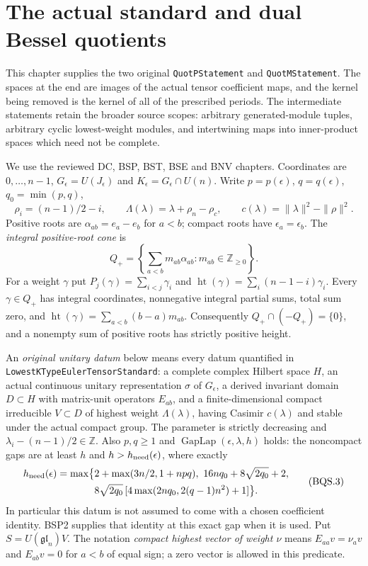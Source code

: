 \section{The actual standard and dual Bessel quotients}
\label{sec:bessel-quotient-suppliers-v52}

This chapter supplies the two original \texttt{QuotPStatement} and
\texttt{QuotMStatement}.  The spaces at the end are images of the actual
tensor coefficient maps, and the kernel being removed is the kernel of
all of the prescribed periods.  The intermediate statements retain the
broader source scopes: arbitrary generated-module tuples, arbitrary
cyclic lowest-weight modules, and intertwining maps into inner-product
spaces which need not be complete.

We use the reviewed DC, BSP, BST, BSE and BNV chapters.  Coordinates are
$0,\ldots,n-1$, $G_\epsilon=U(J_\epsilon)$ and
$K_\epsilon=G_\epsilon\cap U(n)$.  Write $p=p(\epsilon)$, $q=q(\epsilon)$,
$q_0=\min(p,q)$,
\[
 \rho_i=(n-1)/2-i,\qquad
 \Lambda(\lambda)=\lambda+\rho_n-\rho_c,\qquad
 c(\lambda)=\|\lambda\|^2-\|\rho\|^2.
 \tag{BQS.1}
\]
Positive roots are $\alpha_{ab}=e_a-e_b$ for $a<b$; compact roots have
$\epsilon_a=\epsilon_b$.  The \emph{integral positive-root cone} is
\[
 Q_+=\left\{\sum_{a<b}m_{ab}\alpha_{ab}:m_{ab}\in\mathbb Z_{\ge0}\right\}.
 \tag{BQS.2}
\]
For a weight $\gamma$ put $P_j(\gamma)=\sum_{i<j}\gamma_i$ and
$\operatorname{ht}(\gamma)=\sum_i(n-1-i)\gamma_i$.
Every $\gamma\in Q_+$ has integral coordinates, nonnegative integral
partial sums, total sum zero, and
$\operatorname{ht}(\gamma)=\sum_{a<b}(b-a)m_{ab}$.
Consequently $Q_+\cap(-Q_+)=\{0\}$, and a nonempty sum of positive
roots has strictly positive height.

An \emph{original unitary datum} below means every datum quantified in
\texttt{LowestKTypeEuler\allowbreak{}TensorStandard}: a complete complex Hilbert space
$H$, an actual continuous unitary representation $\sigma$ of $G_\epsilon$,
a derived invariant domain $D\subset H$ with matrix-unit operators
$E_{ab}$, and a finite-dimensional compact irreducible
$V\subset D$ of highest weight $\Lambda(\lambda)$, having Casimir
$c(\lambda)$ and stable under the actual compact group.  The parameter is
strictly decreasing and
$\lambda_i-(n-1)/2\in\mathbb Z$.  Also $p,q\ge1$ and
$\operatorname{GapLap}(\epsilon,\lambda,h)$ holds: the noncompact gaps
are at least $h$ and $h>h_{\rm need}(\epsilon)$, where exactly
\[
\begin{split}
h_{\rm need}(\epsilon)=\max\bigl\{&
2+\max(3n/2,1+npq),\
16nq_0+8\sqrt{2q_0}+2,\\
&8\sqrt{2q_0}\,[4\max(2nq_0,2(q-1)n^2)+1]\bigr\}.
\end{split}
\tag{BQS.3}
\]
In particular this datum is not assumed to come with a chosen coefficient
identity.  BSP2 supplies that identity at this exact gap when it is used.
Put $S=U(\mathfrak{gl}_n)V$.  The notation \emph{compact highest vector
of weight $\nu$} means $E_{aa}v=\nu_av$ and $E_{ab}v=0$ for
$a<b$ of equal sign; a zero vector is allowed in this predicate.

